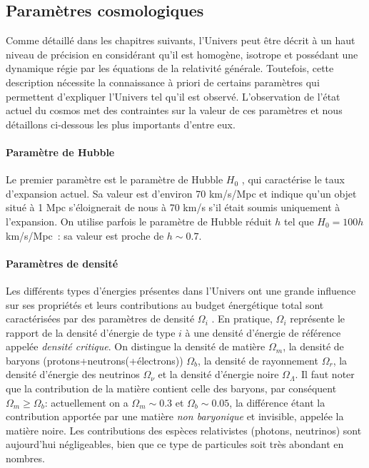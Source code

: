 \subsection{Paramètres cosmologiques}
Comme détaillé dans les chapitres suivants, l'Univers peut être décrit à un haut niveau de précision en considérant qu'il est homogène, isotrope et possédant une dynamique régie par les équations de la relativité générale. Toutefois, cette description nécessite la connaissance à priori de certains paramètres qui permettent d'expliquer l'Univers tel qu'il est observé. L'observation de l'état actuel du cosmos met des contraintes sur la valeur de ces paramètres et nous détaillons ci-dessous les plus importants d'entre eux.

\paragraph{Paramètre de Hubble} Le premier paramètre est le paramètre de Hubble $H_0$ , qui caractérise le taux d'expansion actuel. Sa valeur est d'environ 70 km/s/Mpc et indique qu'un objet situé à 1 Mpc s'éloignerait de nous à 70 km/s s'il était soumis uniquement à l'expansion. On utilise parfois le paramètre de Hubble réduit $h$ tel que $H_0=100 h$ km/s/Mpc~: sa valeur est proche de $h\sim 0.7$.

\paragraph{Paramètres de densité} Les différents types d'énergies présentes dans l'Univers ont une grande influence sur ses propriétés et leurs contributions au budget énergétique total sont caractérisées par des paramètres de densité $\Omega_i$ . En pratique, $\Omega_i$ représente le rapport de la densité d'énergie de type $i$ à une densité d'énergie de référence appelée \textit{densité critique}. On distingue la densité de matière $\Omega_m$, la densité de baryons (protons+neutrons(+électrons)) $\Omega_b$, la densité de rayonnement $\Omega_r$, la densité d'énergie des neutrinos $\Omega_\nu$ et la densité d'énergie noire $\Omega_\Lambda$. Il faut noter que la contribution de la matière contient celle des baryons, par conséquent $\Omega_m\ge\Omega_b$: actuellement on a $\Omega_m\sim 0.3$ et $\Omega_b\sim 0.05$, la différence étant la contribution apportée par une matière \textit{non baryonique} et invisible, appelée la matière noire. Les contributions des espèces relativistes (photons, neutrinos) sont aujourd'hui négligeables, bien que ce type de particules soit très abondant en nombres.

